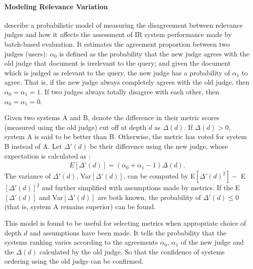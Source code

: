 \documentclass{article}
\begin{document}
\paragraph{Modeling Relevance Variation}

\citet{disagree.btw.judges} describe a probabilistic model of measuring the disagreement between relevance judges and how it affects the assessment of IR system performance made by batch-based evaluation. It estimates the agreement proportion between two judges (users): $\alpha_0$ is defined as the probability that the new judge agrees with the old judge that document is irrelevant to the query; and given the document which is judged as relevant to the query, the new judge has a probability of $\alpha_1$ to agree. That is, if the new judge always completely agrees with the old judge, then $\alpha_0 = \alpha_1 = 1$. If two judges always totally disagree with each other, then $\alpha_0 = \alpha_1 = 0$. 

Given two systems A and B, denote the difference in their metric scores (measured using the old judge) cut off at depth $d$ as $\Delta(d)$. If $\Delta(d)>0$, system A is said to be better than B. Otherwise, the metric has voted for system B instead of A. Let $\Delta'(d)$ be their difference using the new judge, whose expectation is calculated as \cite{disagree.btw.judges}:
\begin{align}
E[\Delta'(d)] = (\alpha_0+\alpha_1-1)\Delta(d).
\end{align}
The variance of $\Delta'(d)$, Var$[\Delta'(d)]$, can be computed by E$[\Delta'(d)^2] - $ E$[\Delta'(d)]^2$ and further simplified with assumptions made by metrics. If the E$[\Delta'(d)]$ and Var$[\Delta'(d)]$ are both known, the probability of $\Delta'(d)\leq 0$ (that is, system A remains superior) can be found. 

This model is found to be useful for selecting metrics when appropriate choice of depth $d$ and assumptions have been made. It tells the probability that the systems ranking varies according to the agreements $\alpha_0$, $\alpha_1$ of the new judge and the $\Delta(d)$ calculated by the old judge. So that the confidence of systems ordering using the old judge can be confirmed. %
\end{document}

